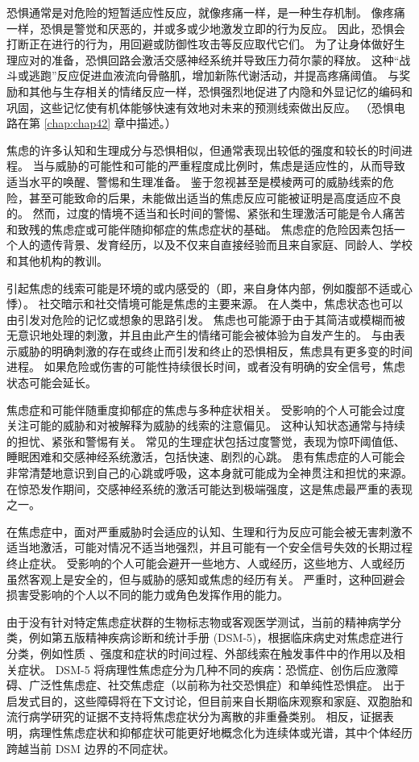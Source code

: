 恐惧通常是对危险的短暂适应性反应，就像疼痛一样，是一种生存机制。 像疼痛一样，恐惧是警觉和厌恶的，并或多或少地激发立即的行为反应。 因此，恐惧会打断正在进行的行为，用回避或防御性攻击等反应取代它们。 为了让身体做好生理应对的准备，恐惧回路会激活交感神经系统并导致压力荷尔蒙的释放。 这种“战斗或逃跑”反应促进血液流向骨骼肌，增加新陈代谢活动，并提高疼痛阈值。 与奖励和其他与生存相关的情绪反应一样，恐惧强烈地促进了内隐和外显记忆的编码和巩固，这些记忆使有机体能够快速有效地对未来的预测线索做出反应。 （恐惧电路在第 \ref{chap:chap42} 章中描述。）

焦虑的许多认知和生理成分与恐惧相似，但通常表现出较低的强度和较长的时间进程。 当与威胁的可能性和可能的严重程度成比例时，焦虑是适应性的，从而导致适当水平的唤醒、警惕和生理准备。 鉴于忽视甚至是模棱两可的威胁线索的危险，甚至可能致命的后果，未能做出适当的焦虑反应可能被证明是高度适应不良的。 然而，过度的情境不适当和长时间的警惕、紧张和生理激活可能是令人痛苦和致残的焦虑症或可能伴随抑郁症的焦虑症状的基础。 焦虑症的危险因素包括一个人的遗传背景、发育经历，以及不仅来自直接经验而且来自家庭、同龄人、学校和其他机构的教训。

引起焦虑的线索可能是环境的或内感受的（即，来自身体内部，例如腹部不适或心悸）。 社交暗示和社交情境可能是焦虑的主要来源。 在人类中，焦虑状态也可以由引发对危险的记忆或想象的思路引发。 焦虑也可能源于由于其简洁或模糊而被无意识地处理的刺激，并且由此产生的情绪可能会被体验为自发产生的。 与由表示威胁的明确刺激的存在或终止而引发和终止的恐惧相反，焦虑具有更多变的时间进程。 如果危险或伤害的可能性持续很长时间，或者没有明确的安全信号，焦虑状态可能会延长。

焦虑症和可能伴随重度抑郁症的焦虑与多种症状相关。 受影响的个人可能会过度关注可能的威胁和对被解释为威胁的线索的注意偏见。 这种认知状态通常与持续的担忧、紧张和警惕有关。 常见的生理症状包括过度警觉，表现为惊吓阈值低、睡眠困难和交感神经系统激活，包括快速、剧烈的心跳。 患有焦虑症的人可能会非常清楚地意识到自己的心跳或呼吸，这本身就可能成为全神贯注和担忧的来源。 在惊恐发作期间，交感神经系统的激活可能达到极端强度，这是焦虑最严重的表现之一。

在焦虑症中，面对严重威胁时会适应的认知、生理和行为反应可能会被无害刺激不适当地激活，可能对情况不适当地强烈，并且可能有一个安全信号失效的长期过程 终止症状。 受影响的个人可能会避开一些地方、人或经历，这些地方、人或经历虽然客观上是安全的，但与威胁的感知或焦虑的经历有关。 严重时，这种回避会损害受影响的个人以不同的能力或角色发挥作用的能力。

由于没有针对特定焦虑症状群的生物标志物或客观医学测试，当前的精神病学分类，例如第五版精神疾病诊断和统计手册 (DSM-5)，根据临床病史对焦虑症进行分类，例如性质 、强度和症状的时间过程、外部线索在触发事件中的作用以及相关症状。 DSM-5 将病理性焦虑症分为几种不同的疾病：恐慌症、创伤后应激障碍、广泛性焦虑症、社交焦虑症（以前称为社交恐惧症）和单纯性恐惧症。 出于启发式目的，这些障碍将在下文讨论，但目前来自长期临床观察和家庭、双胞胎和流行病学研究的证据不支持将焦虑症状分为离散的非重叠类别。 相反，证据表明，病理性焦虑症状和抑郁症状可能更好地概念化为连续体或光谱，其中个体经历跨越当前 DSM 边界的不同症状。

